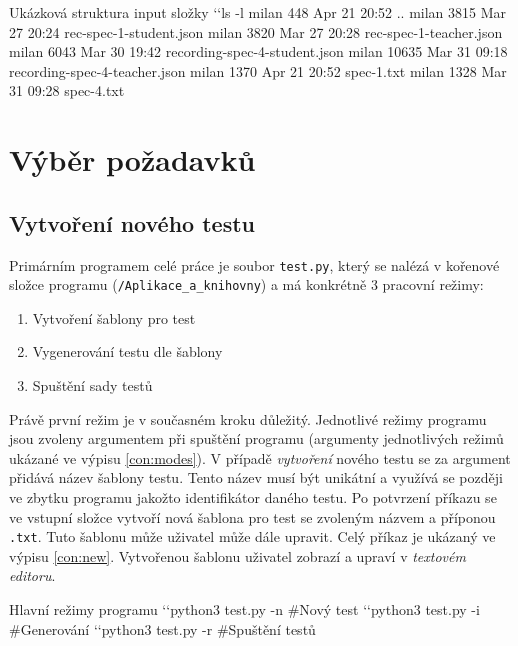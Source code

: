 \documentclass[czech, ma, kiv, he, iso690numb, pdf, viewonly]{fasthesis}
\begin{document}
    \begin{console}{Ukázková struktura input složky \label{con:input}} 
`\uxprompt`ls -l
milan    448 Apr 21 20:52 ..
milan   3815 Mar 27 20:24 rec-spec-1-student.json
milan   3820 Mar 27 20:28 rec-spec-1-teacher.json
milan   6043 Mar 30 19:42 recording-spec-4-student.json
milan  10635 Mar 31 09:18 recording-spec-4-teacher.json
milan   1370 Apr 21 20:52 spec-1.txt
milan   1328 Mar 31 09:28 spec-4.txt\end{console}

    \newpage
    \section{Výběr požadavků}

        \subsection{Vytvoření nového testu} \label{sec:test_creation}

            Primárním programem celé práce je soubor \verb|test.py|, který se nalézá v kořenové složce programu (\verb|/Aplikace_a_knihovny|) a má konkrétně 3 pracovní režimy:
            \begin{enumerate}
                \item Vytvoření šablony pro test
                \item Vygenerování testu dle šablony
                \item Spuštění sady testů
            \end{enumerate}
            Právě první režim je v současném kroku důležitý. Jednotlivé režimy programu jsou zvoleny argumentem při spuštění programu (argumenty jednotlivých režimů ukázané ve výpisu \ref{con:modes}). V případě \textit{vytvoření} nového testu se za argument přidává název šablony testu. Tento název musí být unikátní a využívá se později ve zbytku programu jakožto identifikátor daného testu. Po potvrzení příkazu se ve vstupní složce vytvoří nová šablona pro test se zvoleným názvem a příponou \verb|.txt|. Tuto šablonu může uživatel může dále upravit. Celý příkaz je ukázaný ve výpisu \ref{con:new}. Vytvořenou šablonu uživatel zobrazí a upraví v \textit{textovém editoru}.

            \vfill
            \begin{console}{Hlavní režimy programu \label{con:modes}}
`\uxprompt`python3 test.py -n   #Nový test
`\uxprompt`python3 test.py -i   #Generování
`\uxprompt`python3 test.py -r   #Spuštění testů\end{console}
\end{document}
